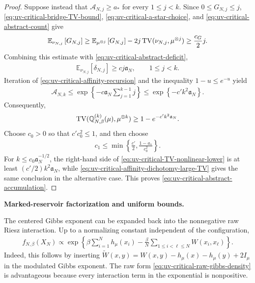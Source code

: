 \documentclass[11pt,reqno]{amsart}
\numberwithin{equation}{section}
\theoremstyle{plain}
\theoremstyle{remark}
\DeclarePairedDelimiter{\pa}{\lparen}{\rparen}
\newcommand{\E}{{\mathbb{E}}}
\newcommand{\Q}{{\mathbb{Q}}}
\newcommand{\tl}{\widetilde}
\newcommand{\be}{\beta}
\newcommand{\TV}{\operatorname{TV}}
\newcommand{\parheading}[1]{\par\medskip\noindent\textbf{#1}\ }
\begin{document}
\begin{proof}
Suppose instead that \(\mathcal A_{N,j}\ge a_*\) for every \(1\le j<k\).  Since \(0\le G_{N,j}\le j\), \eqref{eq:uv-critical-bridge-TV-bound}, \eqref{eq:uv-critical-a-star-choice}, and \eqref{eq:uv-critical-abstract-count} give
\begin{align}\label{eq:uv-critical-bridge-good-count}
 \E_{\nu_{N,j}}\left[G_{N,j}\right]
 \ge\E_{\mu^{\otimes j}}\left[G_{N,j}\right]
 -2j\TV\pa{\nu_{N,j},\mu^{\otimes j}}
 \ge\frac{c_G}{2}j.
\end{align}
Combining this estimate with \eqref{eq:uv-critical-abstract-deficit},
\begin{align}\label{eq:uv-critical-bridge-deficit-lower}
 \E_{\nu_{N,j}}\left[\delta_{N,j}\right]
 \ge c j\mathfrak a_N,
 \qquad 1\le j<k.
\end{align}
Iteration of \eqref{eq:uv-critical-affinity-recursion} and the inequality \(1-u\le e^{-u}\) yield
\begin{align}\label{eq:uv-critical-affinity-exponential-decay}
 \mathcal A_{N,k}
 \le\exp\left\{-c\mathfrak a_N\sum_{j=1}^{k-1}j\right\}
 \le\exp\left\{-c'k^2\mathfrak a_N\right\}.
\end{align}
Consequently,
\begin{align}\label{eq:uv-critical-TV-nonlinear-lower}
 \TV\pa{\Q_{N,\be}^{(k)}(\mu),\mu^{\otimes k}}
 \ge1-e^{-c'k^2\mathfrak a_N}.
\end{align}
Choose \(c_0>0\) so that \(c'c_0^2\le1\), and then choose
\begin{align}\label{eq:uv-critical-final-c1-choice}
 c_1\le\min\left\{\frac{c'}2,\frac{1-a_*}{c_0^2}\right\}.
\end{align}
For \(k\le c_0\mathfrak a_N^{-1/2}\), the right-hand side of \eqref{eq:uv-critical-TV-nonlinear-lower} is at least \((c'/2)k^2\mathfrak a_N\), while \eqref{eq:uv-critical-affinity-dichotomy-large-TV} gives the same conclusion in the alternative case.  This proves \eqref{eq:uv-critical-abstract-accumulation}.
\end{proof}

\parheading{Marked-reservoir factorization and uniform bounds.}

The centered Gibbs exponent can be expanded back into the nonnegative raw Riesz interaction.  Up to a normalizing constant independent of the configuration,
\begin{align}\label{eq:uv-critical-raw-gibbs-density}
 f_{N,\be}(X_N)
 \propto
 \exp\left\{
 \be\sum_{i=1}^Nh_\mu(x_i)
 -\frac\be N\sum_{1\le i<\ell\le N}W(x_i,x_\ell)
 \right\}.
\end{align}
Indeed, this follows by inserting \(\tl W(x,y)=W(x,y)-h_\mu(x)-h_\mu(y)+2I_\mu\) in the modulated Gibbs exponent.  The raw form \eqref{eq:uv-critical-raw-gibbs-density} is advantageous because every interaction term in the exponential is nonpositive.
\end{document}

